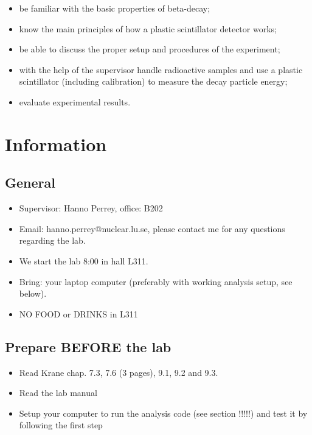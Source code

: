 \documentclass[a4,11pt, notitlepage]{article}
\begin{document}
\begin{itemize}
\item be familiar with the basic properties of beta-decay;
\item know the main principles of how a plastic scintillator detector works;
\item be able to discuss the proper setup and procedures of the experiment;
\item with the help of the supervisor handle radioactive samples and use a
  plastic scintillator (including calibration) to measure the decay particle energy;
\item evaluate experimental results.
\end{itemize}

\pagebreak
\section{Information}


\subsection{General}

\begin{itemize}
\item Supervisor: Hanno Perrey, office: B202
\item Email: hanno.perrey@nuclear.lu.se, please contact me for any questions regarding the lab. 
\item We start the lab 8:00 in hall L311. 
\item Bring: your laptop computer (preferably with working
  analysis setup, see below). 
\item NO FOOD or DRINKS in L311
\end{itemize}



\subsection{Prepare BEFORE the lab}

\begin{itemize}
\item Read Krane chap. 7.3, 7.6 (3 pages), 9.1, 9.2 and 9.3. 
\item Read the lab manual
\item Setup your computer to run the analysis code (see section !!!!!)
  and test it by following the first step
\end{itemize}
\end{document}
